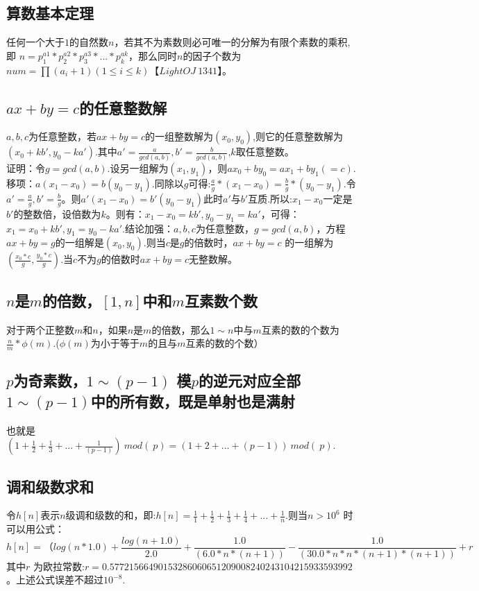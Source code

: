 \subsection{算数基本定理}

任何一个大于$1$的自然数$n$，若其不为素数则必可唯一的分解为有限个素数的乘积,即 $n = p_1^{a1} * p_2^{a2} * p_3^{a3} * ... * p_k^{ak}$，那么同时$n$的因子个数为$num = \prod (a_i + 1)(1 \leq i \leq k)$【$LightOJ\  1341$】。 \\

\subsection{$ax+by=c$的任意整数解}
$a,b,c$为任意整数，若$ax + by = c$的一组整数解为$(x_0, y_0)$,则它的任意整数解为$(x_0 + kb', y_0 - ka')$.其中$a'=\frac{a}{gcd(a,b)},b'=\frac{b}{gcd(a,b)}$,$k$取任意整数。 \\

证明：令$g = gcd(a, b)$.设另一组解为$(x_1, y_1)$，则$ax_0 + by_0 = ax_1 + by_1 (=c)$.移项：$a(x_1 - x_0) = b(y_0 - y_1)$.同除以$g$可得:$\frac{a} {g }* (x_1- x_0) = \frac{b}{g} * (y_0 - y_1)$.令$a' =\frac{ a }{g}, b' = \frac{b}{g}$。则$a'(x_1 - x_0) = b'(y_0 - y_1)$此时$a'$与$b'$互质.所以:$x_1 - x_0$一定是$b'$的整数倍，设倍数为$k$。则有：$x_1 - x_0 = kb', y_0 - y_1 = ka'$，可得：$x_1 = x_0 + kb', y_1 = y_0 - ka'$.结论加强：$a,b,c$为任意整数，$g=gcd(a,b)$，方程$ax + by = g$的一组解是$(x_0, y_0)$.则当$c$是$g$的倍数时，$ax+by=c$ 的一组解为$(\frac{x_0*c}{g}, \frac{y_0 * c}{g})$.当$c$不为$g$的倍数时$ax+by=c$无整数解。 \\

\subsection{$n$是$m$的倍数，$[1,n]$中和$m$互素数个数}
对于两个正整数$m$和$n$，如果$n$是$m$的倍数，那么$1\sim n$中与$m$互素的数的个数为$\frac{n}{m} * \phi(m)$.($\phi(m)$为小于等于$m$的且与$m$互素的数的个数）

\subsection{$p$为奇素数，$1\sim(p - 1)$ 模$p$的逆元对应全部$1\sim(p-1)$中的所有数，既是单射也是满射}
也就是$(1 + \frac{1}{2} + \frac{1}{3} + ... + \frac{1}{(p -1)}) \ mod (\ p) = ( 1 + 2 + ... + (p - 1))\ mod(\ p)$.

\subsection{调和级数求和}
令$h[n]$表示$n$级调和级数的和，即:$h[n] = \frac{1}{1} + \frac{1}{2} + \frac{1}{3} + \frac{1}{4} +...+ \frac{1}{n}$.则当$n > 10^{6}$ 时可以用公式：
$$h[n]=（log(n * 1.0) + \frac{log(n + 1.0)}{2.0} + \frac{1.0}{(6.0 * n * (n + 1))} -\frac{1.0}{(30.0 * n * n * (n + 1) * (n + 1))} + r$$
其中$r$ 为欧拉常数:$r= 0.57721566490153286060651209008240243104215933593992$。上述公式误差不超过$10^{-8}$.

